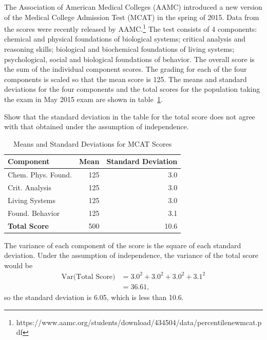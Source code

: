 \begin{example} {The Association of American Medical Colleges (AAMC) introduced a new version of the Medical College Admission Test (MCAT) in the spring of 2015. Data from the scores were recently released by AAMC.\footnote{https://www.aamc.org/students/download/434504/data/percentilenewmcat.pdf}  The test consists of 4 components: chemical and physical foundations of biological systems; critical analysis and reasoning skills; biological and biochemical foundations of living systems; psychological, social and biological foundations of behavior. The overall score is the sum of the individual component scores. The grading for each of the four components is scaled so that the mean score is 125.  The means and standard deviations for the four components and the total scores for the population taking the exam in May 2015 exam are shown in table~\ref{table:mcatScoreDistribution}.
		
		Show that the standard deviation in the table for the total score does not agree with that obtained under the assumption of independence. 
		
		\begin{table}[h]
			\centering
			\begin{tabular}{lrr}
				\hline
				\textbf{Component} & \textbf{Mean} & \textbf{Standard Deviation}\\
				\hline
				Chem. Phys. Found. &   125 &   3.0\\
				Crit. Analysis &   125 &    3.0 \\
				Living  Systems &  125 &     3.0\\
				Found. Behavior&   125 &     3.1\\
				\textbf{Total Score} &    500 &     10.6\\
				\hline
			\end{tabular}
			\caption{Means and Standard Deviations for MCAT Scores}
			\label{table:mcatScoreDistribution}
		\end{table}	
	}
	The variance of each component of the score is the square of each standard deviation.  Under the assumption of independence, the variance of the total score would be 
	\begin{align*}
	\textrm{Var(Total Score)} &= 3.0^2 + 3.0^2 + 3.0^2 + 3.1^2 \\
	&= 36.61,
	\end{align*}
	so the standard deviation is 6.05, which is less than 10.6. 
\end{example}


